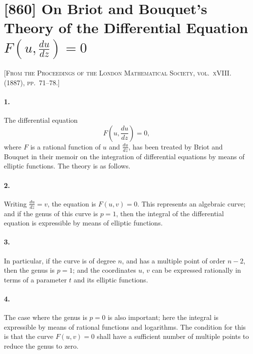 \documentclass[11pt,a4paper]{article}
\theoremstyle{definition}
\begin{document}
\newpage
\section*{[860] On Briot and Bouquet's Theory of the Differential Equation $F(u, \frac{du}{dz}) = 0$}

\noindent\textsc{[From the Proceedings of the London Mathematical Society, vol.~xVIII. (1887), pp.~71--78.]}

\smallskip

\paragraph{1.} The differential equation
\[
F\left(u, \frac{du}{dz}\right) = 0,
\]
where $F$ is a rational function of $u$ and $\frac{du}{dz}$, has been treated by Briot and Bouquet in their memoir on the integration of differential equations by means of elliptic functions. The theory is as follows.

\paragraph{2.} Writing $\frac{du}{dz} = v$, the equation is $F(u, v) = 0$. This represents an algebraic curve; and if the genus of this curve is $p = 1$, then the integral of the differential equation is expressible by means of elliptic functions.

\paragraph{3.} In particular, if the curve is of degree $n$, and has a multiple point of order $n - 2$, then the genus is $p = 1$; and the coordinates $u$, $v$ can be expressed rationally in terms of a parameter $t$ and its elliptic functions.

\paragraph{4.} The case where the genus is $p = 0$ is also important; here the integral is expressible by means of rational functions and logarithms. The condition for this is that the curve $F(u, v) = 0$ shall have a sufficient number of multiple points to reduce the genus to zero.
\end{document}
